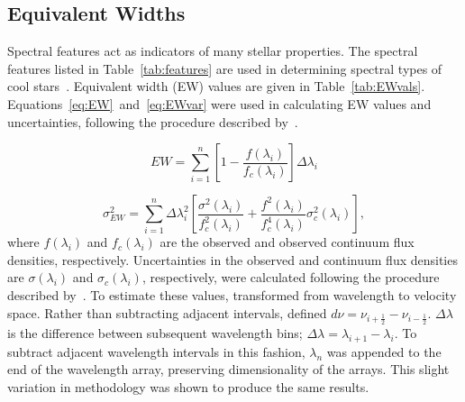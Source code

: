 \subsection{Equivalent Widths}

Spectral features act as indicators of many stellar properties.  The 
spectral features listed in Table~\ref{tab:features} 
are used in determining spectral types of cool 
stars~\cite{Rayner_2009}.  Equivalent width (EW) 
values are given in Table~\ref{tab:EWvals}.  
Equations~\ref{eq:EW}~and~\ref{eq:EWvar} were used in calculating EW values 
and uncertainties, following the procedure described by~\cite{Cushing_2005}. 


\begin{equation}\label{eq:EW}
	EW = \sum_{i=1}^{n} [1 - \frac{f(\lambda_{i})}{f_{c}(\lambda_{i})}] \Delta\lambda_{i}
\end{equation}

\begin{equation}\label{eq:EWvar}
	\sigma_{EW}^{2} = \sum_{i=1}^{n} \Delta\lambda_{i}^{2} [\frac{\sigma^{2}(\lambda_{i})}{f_{c}^{2}(\lambda_{i})} + \frac{f^{2}(\lambda_{i})}{f_{c}^{4}(\lambda_{i})}\sigma_{c}^{2}(\lambda_{i})],
\end{equation}
where $f(\lambda_{i})$ and $f_{c}(\lambda_{i})$ are the observed 
and observed continuum flux densities, respectively.  Uncertainties in the 
observed and continuum flux densities are $\sigma(\lambda_{i})$ and 
$\sigma_{c}(\lambda_{i})$, respectively, were calculated following the procedure 
described by~\cite{Sembach_1992}.  To estimate these values, \cite{Sembach_1992} 
transformed from wavelength to velocity space.  Rather than subtracting adjacent intervals, 
\cite{Sembach_1992} defined $d\nu = \nu_{i+\frac{1}{2}} - \nu_{i-\frac{1}{2}}$.  
$\Delta\lambda$ is the difference between subsequent wavelength bins; 
$\Delta\lambda = \lambda_{i+1} - \lambda_{i}$.  To subtract adjacent 
wavelength intervals in this fashion, $\lambda_{n}$ was appended to the 
end of the wavelength array, preserving dimensionality of the arrays.  
This slight variation in methodology was shown to produce the same results.



